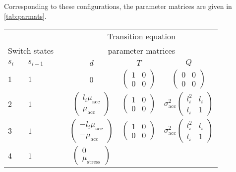 \documentclass[12pt]{article}
\begin{document}
Corresponding to these configurations, the parameter
matrices are given in \autoref{tab:parmats}.
\begin{table}[h!]
\centering
\begin{tabular}[h!]{@{}llcccc@{}}
\toprule
&&&\multicolumn{3}{c}{Transition equation}\\
  \multicolumn{2}{c}{Switch states} &\phantom{a}& \multicolumn{3}{c}{parameter
                                      matrices}\\
  \cmidrule{1-2} \cmidrule{4-6}
  $s_i$ & $s_{i-1}$ && $d$ & $T$ & $Q$ \\
  \midrule
  $1$ &  $1$ && 0 & $\begin{pmatrix}1&0\\0&0\end{pmatrix}$ 
                 & $\begin{pmatrix}0&0\\0&0\end{pmatrix}$\\
  $2$ & $1$ && $\begin{pmatrix} l_i\mu_{\textrm{acc}}\\ \mu_{\textrm{acc}}\end{pmatrix}$ 
                                    & $\begin{pmatrix} 1 & 0 \\ 0 &
                                      0 \end{pmatrix}$ 
        & $\sigma_{\textrm{acc}}^2\begin{pmatrix} l_i^2 & l_i\\ l_i & 1 \end{pmatrix}$\\
  $3$ & $1$ && $\begin{pmatrix} -l_i\mu_{\textrm{acc}}\\ -\mu_{\textrm{acc}}\end{pmatrix}$ 
                                    & $\begin{pmatrix} 1 & 0 \\ 0 &
                                      0 \end{pmatrix}$ 
        & $\sigma_{\textrm{acc}}^2\begin{pmatrix} l_i^2 & l_i\\ l_i & 1 \end{pmatrix}$\\
  $4$ & $1$ && $\begin{pmatrix}0\\\mu_{\textrm{stress}}\end{pmatrix}$ 

\end{tabular}
\end{table}
\end{document}
